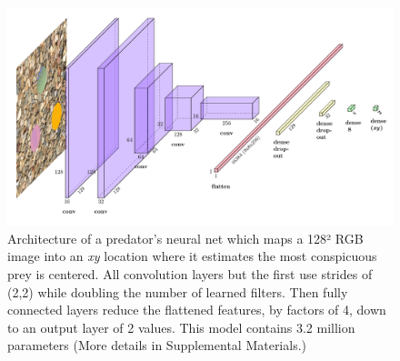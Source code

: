 \documentclass[acmtog,
    anonymous,
    review
    ]{acmart}
\begin{document}

\begin{figure}
    \includegraphics[width=\columnwidth]{predator_cnn.pdf}
    \caption{Architecture of a predator's neural net which maps a 128² RGB image into an \textit{xy} location where it estimates the most conspicuous prey is centered. All convolution layers but the first use strides of (2,2) while doubling the number of learned filters. Then fully connected layers reduce the flattened features, by factors of 4, down to an output layer of 2 values. This model contains 3.2 million parameters (More details in Supplemental Materials.)}
    \label{fig:predator_cnn}
\end{figure}

\end{document}
